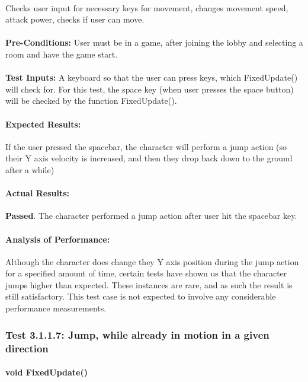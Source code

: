 \documentclass{article}
\begin{document}
    \paragraph{} Checks user input for necessary keys for movement, changes movement speed, attack power, checks if user can move.
    \paragraph{}\textbf{Pre-Conditions:} User must be in a game, after joining the lobby and selecting a room and have the game start.
    \paragraph{}\textbf{Test Inputs:} A keyboard so that the user can press keys, which FixedUpdate() will check for. For this test, the space key (when user presses the space button) will be checked by the function FixedUpdate(). 
    \paragraph{Expected Results:} If the user pressed the spacebar, the character will perform a jump action (so their Y axis velocity is increased, and then they drop back down to the ground after a while)
    \paragraph{Actual Results:} \textbf{Passed}. The character performed a jump action after user hit the spacebar key.
    \paragraph{Analysis of Performance:} Although the character does change they Y axis position during the jump action for a specified amount of time, certain tests have shown us that the character jumps higher than expected. These instances are rare, and as such the result is still satisfactory. This test case is not expected to involve any considerable performance measurements.
    
    \subsubsection{Test 3.1.1.7: Jump, while already in motion in a given direction}
    \paragraph{}\textbf{void FixedUpdate()}
\end{document}
